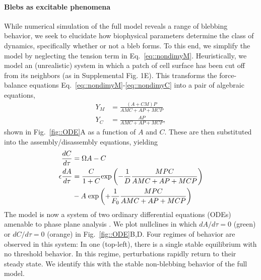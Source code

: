 \paragraph{Blebs as excitable phenomena}

While numerical simulation of the full model reveals a range of blebbing behavior, we seek to elucidate how biophysical parameters determine the class of dynamics, specifically whether or not a bleb forms. To this end, we simplify the model by neglecting the tension term in Eq.~\ref{eq::nondimyM}. Heuristically, we model an (unrealistic) system in which a patch of cell surface has been cut off from its neighbors (as in Supplemental Fig. 1E). This transforms the force-balance equations Eq.~\ref{eq::nondimyM}-\ref{eq::nondimyC} into a pair of algebraic equations,
\begin{align}
Y_M &= \frac{(A+CM)P}{A MC + AP + MCP}\label{eq::ODEyM}\\
Y_C &= \frac{AP}{A MC + AP + MCP}\label{eq::ODEyC},
\end{align}
shown in Fig.~\ref{fig::ODE}A as a function of $A$ and $C$. These are then substituted into the assembly/disassembly equations, yielding
\begin{align}
\frac{d C}{d \tau} &= \Omega A - C \label{eq::ODEC}\\
\epsilon \frac{d A}{d \tau} &= \frac{C}{1+C} \mbox{exp}\left( -\frac{1}{D} \frac{MP C}{A MC + AP + MCP}\right) \notag\\
 &- A\; \mbox{exp}\left( + \frac{1}{F_0}\frac{MP C}{A MC + AP + MCP}\right) \label{eq::ODEA}
\end{align}
The model is now a system of two ordinary differential equations (ODEs) amenable to phase plane analysis \cite{Keshet}. We plot nullclines in which $dA/d\tau=0$ (green) or $dC/d\tau=0$ (orange) in Fig.~\ref{fig::ODE}B,D.
Four regimes of behavior are observed in this system: 
In one (top-left), there is a single stable equilibrium with no threshold behavior. In this regime, perturbations rapidly return to their steady state. We identify this with the stable non-blebbing behavior of the full model. 

